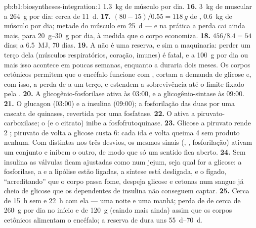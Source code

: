 \begin{solution}{pb:b1:biosyntheses-integration:1}
\qty{1.3}{kg} de músculo por dia.
\textbf{16.} \qty{3}{kg} de  muscular a \qty{264}{g} por dia:
cerca de \qty{11}{d}.
\textbf{17.} $(80 - 15)/0.55 = \qty{118}{g}$ de , \qty{0.6}{kg}
de músculo por dia; metade do músculo em \qty{25}{d} --- e na prática a
perda cai ainda mais, para \qtyrange{20}{30}{g} por dia, à medida que o
corpo economiza.
\textbf{18.} $456/8.4 = 54$ dias; a \qty{6.5}{MJ}, 70 dias.
\textbf{19.} A  não é uma reserva, e sim a maquinaria: perder um
terço dela (músculos respiratórios, coração,  imunes) é fatal,
e a \qty{100}{g} por dia ou mais isso acontece em poucas semanas,
enquanto a  duraria dois meses. Os corpos cetônicos permitem que
o encéfalo funcione com , cortam a demanda de glicose e, com
isso, a perda de  a um terço, e estendem a sobrevivência até o
limite fixado pela .
\textbf{20.} A glicogênio-fosforilase ativa às 03:00, e a
glicogênio-sintase às 09:00.
\textbf{21.} O glucagon (03:00) e a insulina (09:00); a fosforilação das
duas  por uma cascata de quinases, revertida por uma fosfatase.
\textbf{22.} O  ativa a piruvato-carboxilase; o  (e o
citrato) inibe a fosfofrutoquinase.
\textbf{23.} Glicose a piruvato rende 2 ; piruvato de volta a glicose
custa 6: cada ida e volta queima 4  sem produto nenhum. Com 
distintas nos três desvios, os mesmos sinais (, ,
fosforilação) ativam um conjunto e inibem o outro, de modo que só um
sentido fica aberto.
\textbf{24.} Sem insulina as válvulas ficam ajustadas como num jejum,
seja qual for a glicose: a fosforilase, a  e a lipólise
estão ligadas, a síntese está desligada, e o fígado, ``acreditando'' que
o corpo passa fome, despeja glicose e cetonas num sangue já cheio de
glicose que os  dependentes de insulina não conseguem captar.
\textbf{25.} Cerca de \qty{15}{h} sem  e \qty{22}{h} com
ela --- uma noite e uma manhã; perda de  de cerca de
\qty{260}{g} por dia no início e de \qty{120}{g} (caindo mais ainda)
assim que os corpos cetônicos alimentam o encéfalo; a reserva de 
dura uns \qtyrange{55}{70}{d}.
\end{solution}
